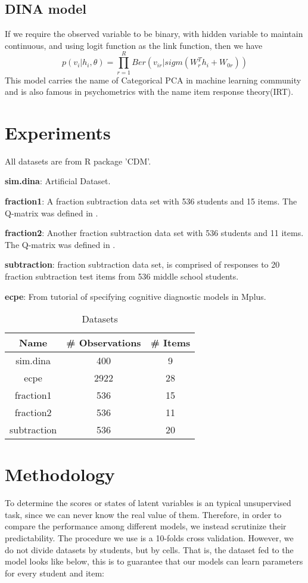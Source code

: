 \documentclass[11pt]{article}
\begin{document}
\subsection{DINA model}
If we require the observed variable to be binary, with hidden variable to maintain continuous, and using logit function as the link function, then we have 
$$p(v_i|h_i,\theta)=\prod_{r=1}^{R}Ber(v_{ir}|sigm(W_r^Th_i+W_{0r}))$$
This model carries the name of Categorical PCA\cite{murphy2012machine} in machine learning community and is also famous in psychometrics with the name item response theory(IRT).

\section{Experiments}
All datasets are from R package 'CDM'\cite{CDM}.

\textbf{sim.dina}: Artificial Dataset.

\textbf{fraction1}: A fraction subtraction data set with 536 students and 15 items. The Q-matrix was defined in \cite{de2009dina}.

\textbf{fraction2}: Another fraction subtraction data set with 536 students and 11 items. The Q-matrix was defined in \cite{de2009dina}.

\textbf{subtraction}: \cite{tatsuoka1984analysis} fraction subtraction data set, is comprised of responses to 20 fraction subtraction test items from 536 middle school students.

\textbf{ecpe}: From \cite{templin2013obtaining} tutorial of specifying cognitive diagnostic models in Mplus.

\begin{table}[!h]
\begin{center}
\begin{tabular}{|c|c|c|}
\hline
Name & \# Observations & \# Items \\
\hline
sim.dina & 400 & 9 \\
\hline
ecpe & 2922 & 28 \\
\hline
fraction1 & 536 & 15 \\
\hline
fraction2 & 536 & 11 \\
\hline
subtraction & 536 & 20 \\
\hline
\end{tabular}
\end{center}
\caption{Datasets}\label{tab:datasets}
\end{table}

\section{Methodology}
\label{sec:Methodology}
To determine the scores or states of latent variables is an typical unsupervised task, since we can never know the real value of them. Therefore, in order to compare the performance among different models, we instead scrutinize their predictability. The procedure we use is a 10-folds cross validation. However, we do not divide datasets by students, but by cells. That is, the dataset fed to the model looks like below, this is to guarantee that our models can learn parameters for every student and item:
\end{document}
